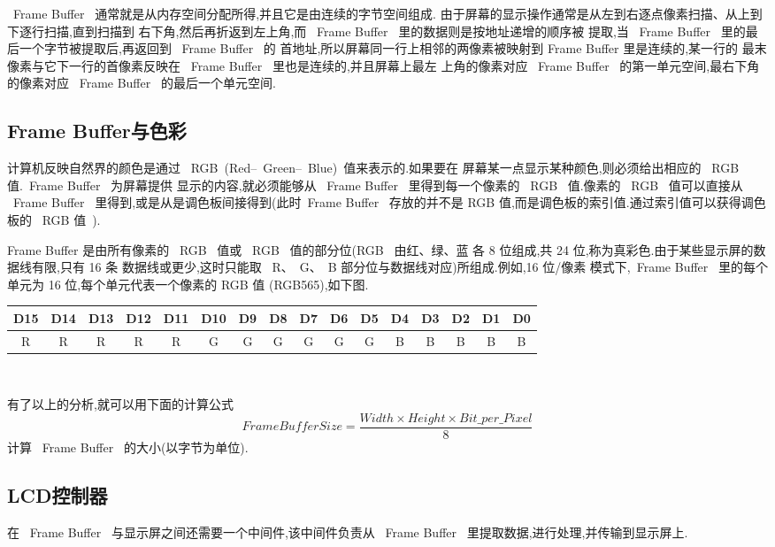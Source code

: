 	~Frame Buffer~ 通常就是从内存空间分配所得,并且它是由连续的字节空间组成.
由于屏幕的显示操作通常是从左到右逐点像素扫描、从上到下逐行扫描,直到扫描到
右下角,然后再折返到左上角,而 ~Frame Buffer~ 里的数据则是按地址递增的顺序被
提取,当 ~Frame Buffer~ 里的最后一个字节被提取后,再返回到 ~Frame Buffer~ 的
首地址,所以屏幕同一行上相邻的两像素被映射到 Frame Buffer 里是连续的,某一行的
最末像素与它下一行的首像素反映在 ~Frame Buffer~ 里也是连续的,并且屏幕上最左
上角的像素对应 ~Frame Buffer~ 的第一单元空间,最右下角的像素对应 ~Frame
Buffer~ 的最后一个单元空间.

\subsection{Frame Buffer与色彩}
	计算机反映自然界的颜色是通过 ~RGB~(Red--~Green--~Blue)~值来表示的.如果要在
屏幕某一点显示某种颜色,则必须给出相应的 ~RGB~ 值.~Frame Buffer~ 为屏幕提供
显示的内容,就必须能够从 ~Frame Buffer~ 里得到每一个像素的 ~RGB~ 值.像素的
~RGB~ 值可以直接从 ~Frame Buffer~ 里得到,或是从是调色板间接得到(此时~Frame
Buffer~ 存放的并不是 RGB 值,而是调色板的索引值.通过索引值可以获得调色板的
~RGB 值~).

	Frame Buffer 是由所有像素的 ~RGB~ 值或 ~RGB~ 值的部分位(RGB~ 由红、绿、蓝
各 8 位组成,共 24 位,称为真彩色.由于某些显示屏的数据线有限,只有 16 条
数据线或更少,这时只能取 ~R、~G、~B 部分位与数据线对应)所组成.例如,16 位/像素
模式下,~Frame Buffer~ 里的每个单元为 16 位,每个单元代表一个像素的 RGB 值
(RGB565),如下图.\\

\small
\begin{tabular}{|*{16}{c|}}
\hline
   D15 & D14 & D13 & D12 & D11 & D10 & D9 & D8 &
        D7 & D6 & D5 & D4 & D3 & D2 & D1 & D0\\\hline
  R & R & R & R & R & G & G & G & G & G & G & B & B & B & B & B\\\hline
\end{tabular}
\ \\
\normalsize

	有了以上的分析,就可以用下面的计算公式
$$
	FrameBufferSize=\frac{Width \times Height \times Bit\_per\_Pixel}{8}
$$
计算 ~Frame Buffer~ 的大小(以字节为单位).

\subsection{LCD控制器}
	在 ~Frame Buffer~ 与显示屏之间还需要一个中间件,该中间件负责从 ~Frame
Buffer~ 里提取数据,进行处理,并传输到显示屏上.

